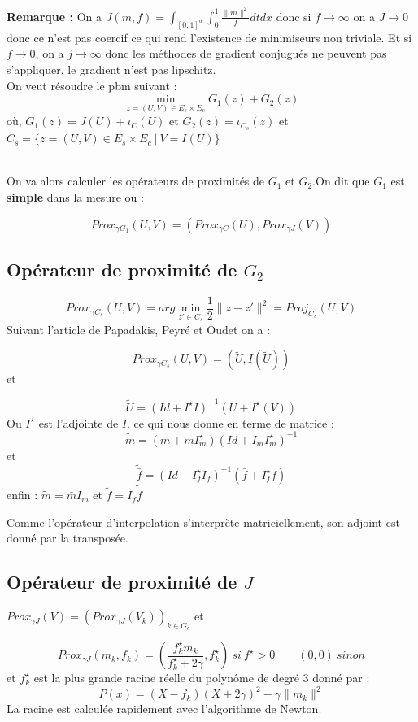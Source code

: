 \documentclass[a4paper,12pt]{article}
\begin{document}
\textbf{Remarque : } On a $J(m,f)=\int_{[0,1]^d}\int_0^1 \frac{\|m\|^2}{f} dtdx$ donc si $f\rightarrow\infty$ on a $J\rightarrow 0$ donc ce n'est pas coercif ce qui rend l'existence de minimiseurs non triviale. Et si $f\rightarrow 0$, on a $j\rightarrow \infty$ donc les méthodes de gradient conjugués ne peuvent pas s'appliquer, le gradient n'est pas lipschitz. \\

On veut résoudre le pbm suivant : 
$$
\min_{z=(U,V)\in E_s\times E_c} G_1(z)+G_2(z)
$$
où, $G_1(z) = J(U)+\iota_C(U)$ et $G_2(z)=\iota_{C_s}(z)$ et $C_s=\{z=(U,V)\in E_s\times E_c\ | \ V=I(U) \}$


\\

On va alors calculer les opérateurs de proximités de $G_1$ et $G_2$.On dit que $G_1$ est \textbf{simple} dans la mesure ou : 

$$
Prox_{\gamma G_1} (U,V) = (Prox_{\gamma C} (U),Prox_{\gamma J} (V))
$$

\subsection{Opérateur de proximité de $G_2$}

$$
Prox_{\gamma C_s} (U,V) = arg\min_{z'\in C_s} \frac{1}{2}\|z-z'\|^2= Proj_{C_s}(U,V)
$$
Suivant l'article de Papadakis, Peyré et Oudet on a :

$$
Prox_{\gamma C_s} (U,V)  = (\tilde{U},I(\tilde{U}))
$$
et 

$$
\tilde{U} = (Id +I^{\star}I)^{-1}(U+I^{\star}(V))
$$
Ou $I^{\star}$ est l'adjointe de $I$. ce qui nous donne en terme de matrice : 
$$
\tilde{\bar{m}} = (\bar{m}+mI_m^{\star})(Id +I_mI_m^{\star})^{-1}
$$
et 
$$
\tilde{\bar{f}} = (Id +I_f^{\star}I_f)^{-1}(\bar{f}+I_f^{\star}f)
$$
enfin : $\tilde{m}=\tilde{\bar{m}}I_m$ et $\tilde{f}=I_f\tilde{\bar{f}}$

Comme l'opérateur d'interpolation s'interprète matriciellement, son adjoint est donné par la transposée. 

\subsection{Opérateur de proximité de $J$}

$Prox_{\gamma J}(V)=(Prox_{\gamma J}(V_k))_{k\in G_c}$ et 

$$
Prox_{\gamma J}(m_k,f_k) = (\frac{f^{\star}_km_k}{f^{\star}_k+2\gamma},f^{\star}_k)\ si\ f^{\star}>0 \qquad (0,0)\ sinon
$$ 
et $f^{\star}_k$ est la plus grande racine réelle du polynôme de degré 3 donné par : 
$$
P(x) = (X-f_k)(X+2\gamma)^2-\gamma \|m_k\|^2
$$
La racine est calculée rapidement avec l’algorithme de Newton. 
\end{document}
